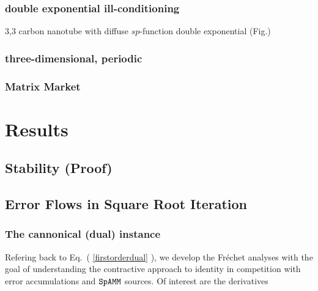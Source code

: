\documentclass[letterpaper,twocolumn,amsmath,amsfont,amssymb,english,aps,jcp,preprintnumbers,groupaddress,nofootinbib,tightenlines]{revtex4}
\newcommand{\mat}[1]{\boldsymbol{#1}}
\begin{document}
\subsubsection{double exponential ill-conditioning}
3,3 carbon nanotube with diffuse $sp$-function
double exponential (Fig.)

\subsubsection{three-dimensional, periodic}
\subsubsection{Matrix Market}


\section{Results}

\subsection{Stability (Proof)}


\subsection{Error Flows in Square Root Iteration}

\subsubsection{The cannonical (dual) instance}
 
Refering back to Eq.~( \ref{firstorderdual} ), we develop the Fr\'{e}chet analyses \cite{} with the goal of understanding
the contractive approach to identity in competition with error accumulations and $\tt SpAMM$ sources.
Of interest are the derivatives 

\end{document}
